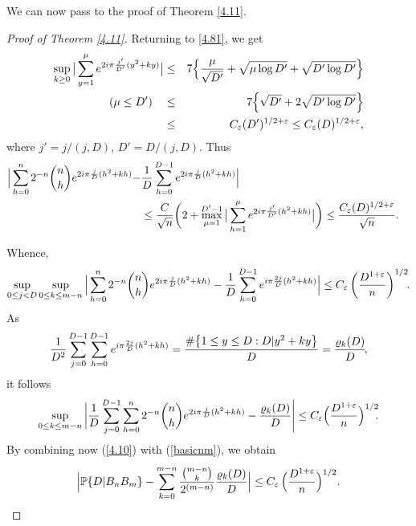 \documentclass[11pt,draft,reqno]{amsart}
\theoremstyle{definition}
\theoremstyle{remarks}
\numberwithin{equation}{section}
\def \e{{\varepsilon}}
\def \m{{\mu}}
\def\P{{\mathcal P}}
\def\P{{\mathbb P}}
\begin{document}
 We can now pass to the proof of Theorem \ref{4.11}.
 \begin{proof}[Proof of Theorem \ref{4.11}]
Returning to \eqref{4.81}, we get  
\begin{eqnarray*}\sup_{k\ge 0}\big|\sum_{y=1}^{\m} e^{2i\pi{j'\over D'} 
(y^2+ky)} 
\big|&\le & 7\Big\{{\m \over  \sqrt{ D'}}+\sqrt{ \m\log D'} + \sqrt{D'\log D'} \Big\}
 \cr (\m \le
D')\quad & \le & 7  \Big\{ \sqrt{ D'}+2\sqrt{ D'\log D'} \Big\}
\cr   & \le& C_\e  (D')^{1/2+ \e}\le C_\e  (D )^{1/2+ \e}, 
\end{eqnarray*}
 where  
$j'=  j/(j,D)
$,
$D'=D/(j,D)$.
Thus
\begin{align}  \label{4.81a}   \Big|\sum_{h=0}^n   2^{-n}{{n}\choose{h}} e^{2i\pi{j\over D} (h^2+kh)}-& {1\over D}\sum_{h=
0}^{D-1}e^{2i\pi{j\over D}  (h^2+kh)} \Big|
\cr &\le  {C\over \sqrt n}\bigg(2+\max_{\m=1}^{D'-1} \big|\sum_{h=1}^{\m} e^{2i\pi{j'\over D'} 
(h^2+kh)} 
\big| \bigg)
  \le  {C_\e  (D )^{1/2+ \e}\over \sqrt n}.
\end{align} 
 
 Whence, 
\begin{equation}\label{4.9} \sup_{ 0\le j< D }\sup_{0\le k\le m-n}\Big|\sum_{h=0}^n   2^{-n}{{n}\choose{h}} e^{2i\pi{j\over D} (h^2+kh)}- {1\over D}\sum_{h=
0}^{D-1}e^{ i\pi{2j\over D}  (h^2+kh)} \Big|\le C_\e \left({     D  ^{1 + \e}\over   n }\right)^{1/2 } \! \!.
\end{equation}  
As
\begin{equation}\label{rho.} {1\over  D^2}\sum_{j=0}^{D-1} \sum_{h= 0}^{D-1}e^{ i\pi{2j\over D} 
(h^2+kh)}={\#\big\{1\le y\le D: D|y^2+ky\big\}\over D }
={\varrho_k(D)\over D } \!, 
\end{equation} 
it follows  
\begin{equation}\label{4.10}  \sup_{0\le k\le m-n} \bigg|{1\over D}\sum_{   j=0}^{D-1}\sum_{h=0}^n   2^{-n}{{n}\choose{h}} e^{2i\pi{j\over D} (h^2+kh)}
   -{\varrho_k(D)\over D } \Bigg|  \le C_\e \Big({     D  ^{1 + \e}\over   n }\Big)^{1/2 }\!\!
.
\end{equation} 
By combining now (\ref{4.10}) with (\ref{basicnm}), we obtain
$$ \Big|\P \{ D|B_nB_m \}-   \sum_{k=0}^{m-n} { {{m-n}\choose {k}} \over 2^{ (m-n)}  } {\varrho_k(D)\over D } 
\Big|
\le C_\e\,
\Big({     D  ^{1 + \e}\over   n }\Big)^{1/2 }. 
$$
\end{proof} 
 
     
   
  
  
     \medskip \par
 
\end{document}
